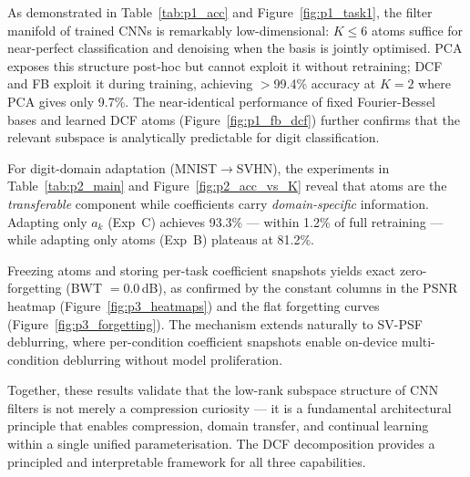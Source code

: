 \documentclass[11pt,letterpaper]{article}
\begin{document}
\begin{description}[leftmargin=0pt]
  \item[Part 1 reveals the structure.]
        As demonstrated in Table~\ref{tab:p1_acc} and
        Figure~\ref{fig:p1_task1}, the filter manifold of trained CNNs is
        remarkably low-dimensional: $K \le 6$ atoms suffice for
        near-perfect classification and denoising when the basis is jointly
        optimised.  PCA exposes this structure post-hoc but cannot exploit
        it without retraining; DCF and FB exploit it during training,
        achieving $>$99.4\% accuracy at $K=2$ where PCA gives only 9.7\%.
        The near-identical performance of fixed Fourier-Bessel bases and
        learned DCF atoms (Figure~\ref{fig:p1_fb_dcf}) further confirms
        that the relevant subspace is analytically predictable for digit
        classification.

  \item[Part 2 exploits the structure for transfer.]
        For digit-domain adaptation (MNIST$\to$SVHN), the experiments
        in Table~\ref{tab:p2_main} and Figure~\ref{fig:p2_acc_vs_K}
        reveal that atoms are the \emph{transferable} component while
        coefficients carry \emph{domain-specific} information.
        Adapting only $a_k$ (Exp~C) achieves 93.3\% --- within 1.2\% of
        full retraining --- while adapting only atoms (Exp~B) plateaus at
        81.2\%.

  \item[Part 3 exploits the structure for continual learning.]
        Freezing atoms and storing per-task coefficient snapshots yields
        exact zero-forgetting (BWT $= 0.0$\,dB), as confirmed by the
        constant columns in the PSNR heatmap (Figure~\ref{fig:p3_heatmaps})
        and the flat forgetting curves (Figure~\ref{fig:p3_forgetting}).
        The mechanism extends naturally to SV-PSF deblurring, where
        per-condition coefficient snapshots enable on-device
        multi-condition deblurring without model proliferation.
\end{description}

\noindent
Together, these results validate that the low-rank subspace structure of
CNN filters is not merely a compression curiosity --- it is a
fundamental architectural principle that enables compression, domain
transfer, and continual learning within a single unified
parameterisation.  The DCF decomposition provides a principled and
interpretable framework for all three capabilities.
\end{document}
